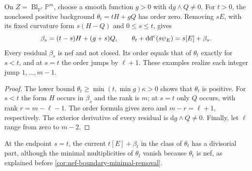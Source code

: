 \begin{example}\label{ex:nef-nonclosed-projective-order-jumps}
On $Z=\operatorname{Bl}_{\mathbb P^\ell}\mathbb P^m$, choose a smooth function $g>0$ with $\mathrm dg\wedge Q\ne0$. For $t>0$, the nonclosed positive background $\theta_t=tH+gQ$ has order zero. Removing $sE$, with its fixed curvature form $s(H-Q)$ and $0\leq s\leq t$, gives
\[
 \beta_s=(t-s)H+(g+s)Q,\qquad
 \theta_t+\mathrm{dd}^{\mathrm{c}}(s\psi_E)=s[E]+\beta_s.
\]
Every residual $\beta_s$ is nef and not closed. Its order equals that of $\theta_t$ exactly for $s<t$, and at $s=t$ the order jumps by $\ell+1$. These examples realize each integer jump $1,\ldots,m-1$.
\end{example}
\begin{proof}
The lower bound $\theta_t\geq\min(t,\min g)\kappa>0$ shows that $\theta_t$ is positive. For $s<t$ the form $H$ occurs in $\beta_s$ and the rank is $m$; at $s=t$ only $Q$ occurs, with rank $r=m-\ell-1$. The order formula gives zero and $m-r=\ell+1$, respectively. The exterior derivative of every residual is $\mathrm dg\wedge Q\ne0$. Finally, let $\ell$ range from zero to $m-2$.
\end{proof}

At the endpoint $s=t$, the current $t[E]+\beta_t$ in the class of $\theta_t$ has a divisorial part, although the minimal multiplicities of $\theta_t$ vanish because $\theta_t$ is nef, as explained before \cref{cor:nef-boundary-minimal-removal}.
